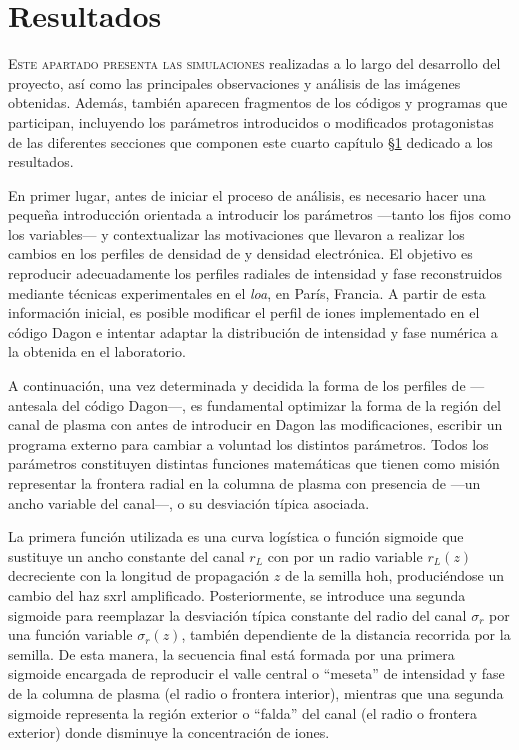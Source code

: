 \chapter{Resultados}\label{cap:4}
\lettrine{E}{ste apartado presenta las simulaciones} realizadas a lo largo del desarrollo del proyecto, así como las principales observaciones y análisis de las imágenes obtenidas. Además, también aparecen fragmentos de los códigos y programas que participan, incluyendo los parámetros introducidos o modificados protagonistas de las diferentes secciones que componen este cuarto capítulo \S\ref{cap:4} dedicado a los resultados.

En primer lugar, antes de iniciar el proceso de análisis, es necesario hacer una pequeña introducción orientada a introducir los parámetros ---tanto los fijos como los variables--- y contextualizar las motivaciones que llevaron a realizar los cambios en los perfiles de densidad de  y densidad electrónica. El objetivo es reproducir adecuadamente los perfiles radiales de intensidad y fase reconstruidos mediante técnicas experimentales en el \emph{\acrfull{loa}}, en París, Francia. A partir de esta información inicial, es posible modificar el perfil de iones implementado en el código Dagon e intentar adaptar la distribución de intensidad y fase numérica a la obtenida en el laboratorio. 

A continuación, una vez determinada y decidida la forma de los perfiles de  ---antesala del código Dagon---, es fundamental optimizar la forma de la región del canal de plasma con  antes de introducir en Dagon las modificaciones, escribir un programa externo para cambiar a voluntad los distintos parámetros. Todos los parámetros constituyen distintas funciones matemáticas que tienen como misión representar la frontera radial en la columna de plasma con presencia de  ---un ancho variable del canal---, o su desviación típica asociada.

La primera función utilizada es una curva logística o función sigmoide que sustituye un ancho constante del canal $r_{L}$ con  por un radio variable $r_{L}(z)$ decreciente con la longitud de propagación $z$ de la semilla \acrshort{hoh}, produciéndose un cambio del haz \acrshort{sxrl} amplificado. Posteriormente, se introduce una segunda sigmoide para reemplazar la desviación típica constante del radio del canal $\sigma_{r}$ por una función variable $\sigma_{r}(z)$, también dependiente de la distancia recorrida por la semilla. De esta manera, la secuencia final está formada por una primera sigmoide encargada de reproducir el valle central o \enquote{meseta} de intensidad y fase de la columna de plasma (el radio o frontera interior), mientras que una segunda sigmoide representa la región exterior o \enquote{falda} del canal (el radio o frontera exterior) donde disminuye la concentración de iones.

